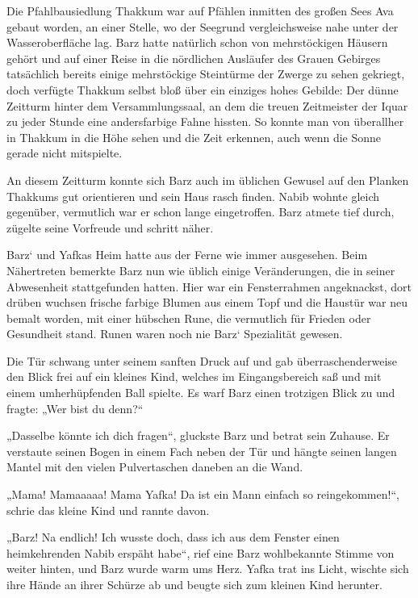 \trennzeichen



Die Pfahlbausiedlung Thakkum war auf Pfählen inmitten des großen Sees Ava gebaut worden, an einer Stelle, wo der Seegrund vergleichsweise nahe unter der Wasseroberfläche lag. Barz hatte natürlich schon von mehrstöckigen Häusern gehört und auf einer Reise in die nördlichen Ausläufer des Grauen Gebirges tatsächlich bereits einige mehrstöckige Steintürme der Zwerge zu sehen gekriegt, doch verfügte Thakkum selbst bloß über ein einziges hohes Gebilde: Der dünne Zeitturm hinter dem Versammlungssaal, an dem die treuen Zeitmeister der Iquar zu jeder Stunde eine andersfarbige Fahne hissten. So konnte man von überallher in Thakkum in die Höhe sehen und die Zeit erkennen, auch wenn die Sonne gerade nicht mitspielte.

An diesem Zeitturm konnte sich Barz auch im üblichen Gewusel auf den Planken Thakkums gut orientieren und sein Haus rasch finden. Nabib wohnte gleich gegenüber, vermutlich war er schon lange eingetroffen. Barz atmete tief durch, zügelte seine Vorfreude und schritt näher.

Barz‘ und Yafkas Heim hatte aus der Ferne wie immer ausgesehen. Beim Nähertreten bemerkte Barz nun wie üblich einige Veränderungen, die in seiner Abwesenheit stattgefunden hatten. Hier war ein Fensterrahmen angeknackst, dort drüben wuchsen frische farbige Blumen aus einem Topf und die Haustür war neu bemalt worden, mit einer hübschen Rune, die vermutlich für Frieden oder Gesundheit stand. Runen waren noch nie Barz‘ Spezialität gewesen.

Die Tür schwang unter seinem sanften Druck auf und gab überraschenderweise den Blick frei auf ein kleines Kind, welches im Eingangsbereich saß und mit einem umherhüpfenden Ball spielte. Es warf Barz einen trotzigen Blick zu und fragte: „Wer bist du denn?“

„Dasselbe könnte ich dich fragen“, gluckste Barz und betrat sein Zuhause. Er verstaute seinen Bogen in einem Fach neben der Tür und hängte seinen langen Mantel mit den vielen Pulvertaschen daneben an die Wand.

„Mama! Mamaaaaa! Mama Yafka! Da ist ein Mann einfach so reingekommen!“, schrie das kleine Kind und rannte davon.

„Barz! Na endlich! Ich wusste doch, dass ich aus dem Fenster einen heimkehrenden Nabib erspäht habe“, rief eine Barz wohlbekannte Stimme von weiter hinten, und Barz wurde warm ums Herz. Yafka trat ins Licht, wischte sich ihre Hände an ihrer Schürze ab und beugte sich zum kleinen Kind herunter.

